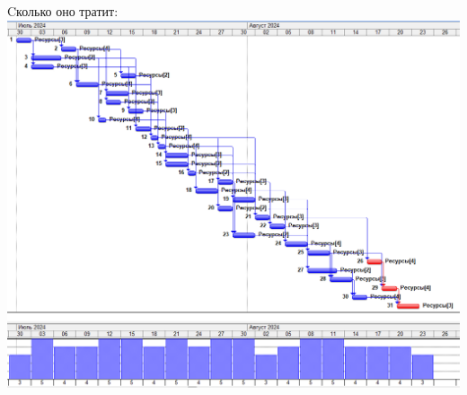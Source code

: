 \documentclass[14pt]{article}
\begin{document}
		{\LARGE Cколько оно тратит:}\\
		\includegraphics[width=\textwidth]{../img/2a2_answer.png}\\ 
\end{document}
